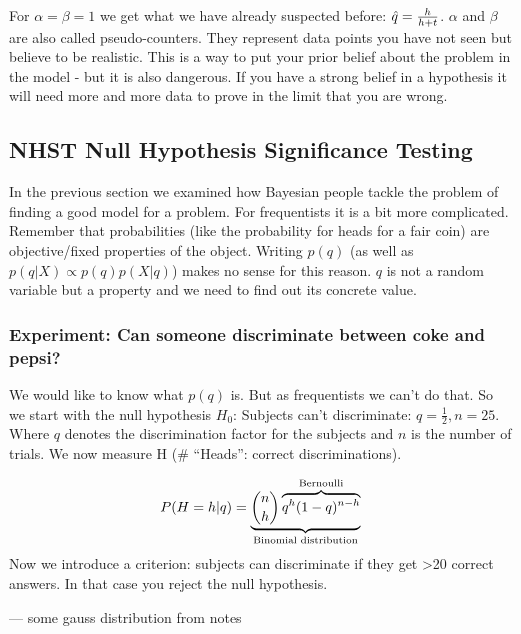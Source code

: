 
For $\alpha = \beta = 1$ we get what we have already suspected before: $\est{q}=\frac{h}{h+t}$. $\alpha$ and $\beta$ are also called pseudo-counters. They represent data points you have not seen but believe to be realistic. This is a way to put your prior belief about the problem in the model - but it is also dangerous. If you have a strong belief in a hypothesis it will need more and more data to prove in the limit that you are wrong.

\subsection[Null Hypothesis Significance Testing (NHST)]{NHST Null Hypothesis Significance Testing}
In the previous section we examined how Bayesian people tackle the problem of finding a good model for a problem. For frequentists it is a bit more complicated. Remember that probabilities (like the probability for heads for a fair coin) are objective/fixed properties of the object. Writing $p(q)$ (as well as $p(q|X) \propto p(q)p(X|q)$) makes no sense for this reason. $q$ is not a random variable but a property and we need to find out its concrete value.

\subsubsection*{Experiment: Can someone discriminate between coke and pepsi?}

We would like to know what $p(q)$ is. But as frequentists we can't do that. So we start with the null hypothesis $H_0$: Subjects can't discriminate: $q = \frac{1}{2}, n = 25$. Where $q$ denotes the discrimination factor for the subjects and $n$ is the number of trials. We now measure H (\# ``Heads'': correct discriminations).

\begin{align*}
P(H=h|q) = \underbrace{ \binom{n}{h} \overbrace{q^h (1-q)^{n-h}}^\text{Bernoulli} }_\text{Binomial distribution}\index{Binomial Distribution}
\end{align*}
Now we introduce a criterion: subjects can discriminate if they get >20 correct answers. In that case you reject the null hypothesis.

--- some gauss distribution from notes

